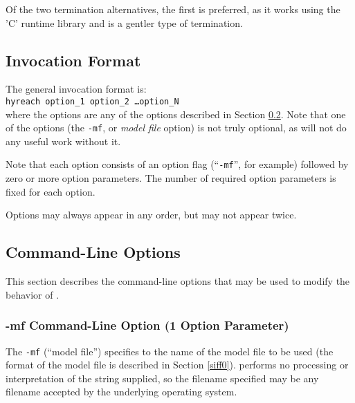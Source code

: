 Of the two termination alternatives, the first is preferred, as it works using
the 'C' runtime library and is a gentler type of termination.


\subsection{Invocation Format}
\label{sinv0:sinf0}

The general invocation format is: \\

\texttt{hyreach option\_1 option\_2 \ldots option\_N} \\

\noindent{}where the options are any of the options 
described in Section \ref{sinv0:sclo0}.  Note that 
one of the options (the \texttt{-mf}, or \emph{model file} 
option) is not truly optional, as \swname{} will not 
do any useful work without it.

Note that each option consists of an option flag
(``\texttt{-mf}'', for example) followed by zero
or more option parameters.  The number of required
option parameters is fixed for each option.

Options may always appear in any order, but may not
appear twice.


\subsection{Command-Line Options}
\label{sinv0:sclo0}

This section describes the command-line options that may be used to modify the 
behavior of \swname{}.

\subsubsection{-mf Command-Line Option (1 Option Parameter)}
The \texttt{-mf} (``model file'') specifies to 
\swname{} the name of the model file to be used (the format of
the model file is described in Section \ref{siff0}).
\swname{} performs no processing or interpretation of the string
supplied, so the filename specified may be any filename accepted
by the underlying operating system.

